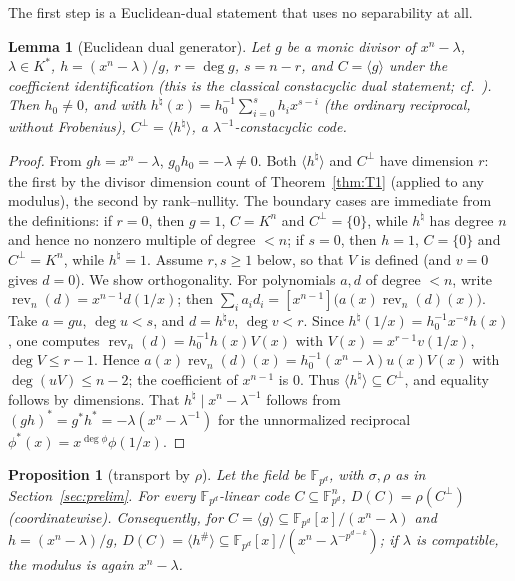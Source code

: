 \documentclass[11pt]{article}
\newtheorem{lemma}[theorem]{Lemma}
\newtheorem{proposition}[theorem]{Proposition}
\theoremstyle{definition}
\theoremstyle{remark}
\begin{document}
The first step is a Euclidean-dual statement that uses no separability
at all.

\begin{lemma}[Euclidean dual generator]\label{lem:RR3}
Let \(g\) be a monic divisor of \(x^n - \lambda\), \(\lambda \in K^*\),
\(h = (x^n-\lambda)/g\), \(r = \deg g\), \(s = n - r\), and
\(C = \langle g \rangle\) under the coefficient identification (this is
the classical constacyclic dual statement;
cf.~\cite{HP2003, MS1977}). Then
\(h_0 \ne 0\), and with
\(h^{\natural}(x) = h_0^{-1} \sum_{i=0}^{s} h_i x^{s-i}\) (the ordinary
reciprocal, without Frobenius),
\(C^\perp = \langle h^{\natural} \rangle\), a \(\lambda^{-1}\)-constacyclic
code.
\end{lemma}

\begin{proof}
From \(gh = x^n - \lambda\), \(g_0 h_0 = -\lambda \ne 0\). Both
\(\langle h^{\natural} \rangle\) and \(C^\perp\) have dimension \(r\):
the first by the divisor dimension count of Theorem~\ref{thm:T1}
(applied to any modulus), the second by rank--nullity. The boundary
cases are immediate from the definitions: if \(r = 0\), then \(g = 1\),
\(C = K^n\) and \(C^\perp = \{0\}\), while \(h^{\natural}\) has degree
\(n\) and hence no nonzero multiple of degree \(< n\); if \(s = 0\), then
\(h = 1\), \(C = \{0\}\) and \(C^\perp = K^n\), while
\(h^{\natural} = 1\). Assume \(r, s \ge 1\) below, so that \(V\) is
defined (and \(v = 0\) gives \(d = 0\)). We show orthogonality. For polynomials \(a, d\) of degree \(< n\), write
\(\operatorname{rev}_n(d) = x^{n-1} d(1/x)\); then
\(\sum_i a_i d_i = [x^{n-1}]\big(a(x) \operatorname{rev}_n(d)(x)\big)\).
Take \(a = gu\), \(\deg u < s\), and \(d = h^{\natural} v\),
\(\deg v < r\). Since
\(h^{\natural}(1/x) = h_0^{-1} x^{-s} h(x)\), one computes
\(\operatorname{rev}_n(d) = h_0^{-1} h(x) V(x)\) with
\(V(x) = x^{r-1} v(1/x)\), \(\deg V \le r-1\). Hence
\(a(x)\operatorname{rev}_n(d)(x) = h_0^{-1} (x^n - \lambda) u(x) V(x)\)
with \(\deg(uV) \le n-2\); the coefficient of \(x^{n-1}\) is \(0\).
Thus \(\langle h^{\natural}\rangle \subseteq C^\perp\), and equality
follows by dimensions. That \(h^{\natural} \mid x^n - \lambda^{-1}\)
follows from \((gh)^* = g^* h^* = -\lambda(x^n - \lambda^{-1})\) for the
unnormalized reciprocal \(\phi^*(x) = x^{\deg\phi}\phi(1/x)\).
\end{proof}

\begin{proposition}[transport by \(\rho\)]\label{prop:transport}
Let the field be \(\mathbb{F}_{p^d}\), with \(\sigma, \rho\) as in
Section~\ref{sec:prelim}. For every \(\mathbb{F}_{p^d}\)-linear code
\(C \subseteq \mathbb{F}_{p^d}^n\),
\(D(C) = \rho(C^\perp)\) (coordinatewise). Consequently, for
\(C = \langle g \rangle \subseteq \mathbb{F}_{p^d}[x]/(x^n-\lambda)\) and
\(h = (x^n-\lambda)/g\),
\(D(C) = \langle h^{\#} \rangle \subseteq
\mathbb{F}_{p^d}[x]/(x^n - \lambda^{-p^{d-k}})\); if \(\lambda\) is
compatible, the modulus is again \(x^n - \lambda\).
\end{proposition}
\end{document}
